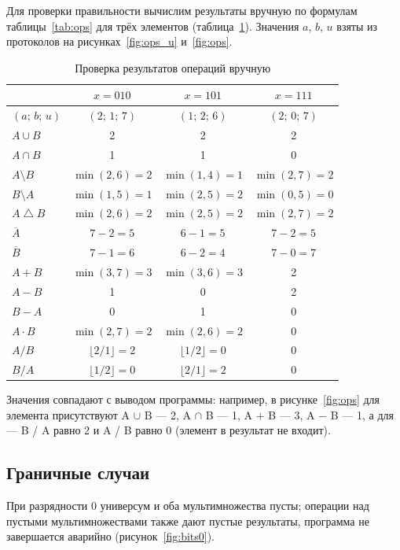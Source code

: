 \documentclass[14pt,a4paper]{extarticle}
\newcommand{\code}[1]{{\monofont #1}}
\newcommand{\bigtri}{\mathbin{\triangle}}
\begin{document}
Для проверки правильности вычислим результаты вручную по формулам таблицы~\ref{tab:ops} для трёх элементов (таблица~\ref{tab:check}). Значения $a$, $b$, $u$ взяты из протоколов на рисунках~\ref{fig:ops_u} и~\ref{fig:ops}.

\begin{table}[H]
\caption{Проверка результатов операций вручную}\label{tab:check}
\centering\small\singlespacing
\begin{tabular}{lccc}
\toprule
 & $x=010$ & $x=101$ & $x=111$ \\
\midrule
$(a;\,b;\,u)$ & $(2;\,1;\,7)$ & $(1;\,2;\,6)$ & $(2;\,0;\,7)$ \\
$A\cup B$ & 2 & 2 & 2 \\
$A\cap B$ & 1 & 1 & 0 \\
$A\setminus B$ & $\min(2,6)=2$ & $\min(1,4)=1$ & $\min(2,7)=2$ \\
$B\setminus A$ & $\min(1,5)=1$ & $\min(2,5)=2$ & $\min(0,5)=0$ \\
$A\bigtri B$ & $\min(2,6)=2$ & $\min(2,5)=2$ & $\min(2,7)=2$ \\
$\overline{A}$ & $7-2=5$ & $6-1=5$ & $7-2=5$ \\
$\overline{B}$ & $7-1=6$ & $6-2=4$ & $7-0=7$ \\
$A+B$ & $\min(3,7)=3$ & $\min(3,6)=3$ & 2 \\
$A-B$ & 1 & 0 & 2 \\
$B-A$ & 0 & 1 & 0 \\
$A\cdot B$ & $\min(2,7)=2$ & $\min(2,6)=2$ & 0 \\
$A/B$ & $\lfloor 2/1\rfloor=2$ & $\lfloor 1/2\rfloor=0$ & 0 \\
$B/A$ & $\lfloor 1/2\rfloor=0$ & $\lfloor 2/1\rfloor=2$ & 0 \\
\bottomrule
\end{tabular}
\end{table}

Значения совпадают с выводом программы: например, в рисунке~\ref{fig:ops} для элемента \code{010} присутствуют \code{A $\cup$ B} --- 2, \code{A $\cap$ B} --- 1, \code{A $+$ B} --- 3, \code{A $-$ B} --- 1, а для \code{101} --- \code{B / A} равно 2 и \code{A / B} равно 0 (элемент в результат не входит).

\subsection{Граничные случаи}

При разрядности 0 универсум и оба мультимножества пусты; операции над пустыми мультимножествами также дают пустые результаты, программа не завершается аварийно (рисунок~\ref{fig:bits0}).
\end{document}
